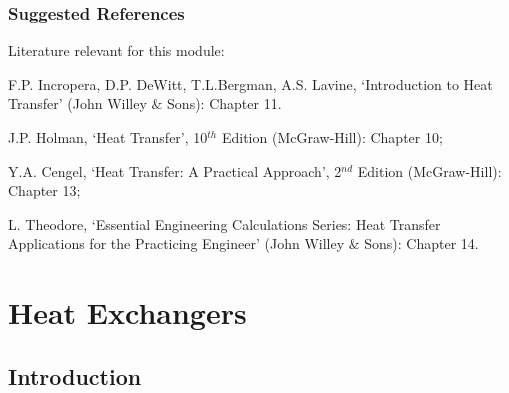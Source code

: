 \documentclass[10pt,compress,unknownkeysallowed]{beamer}
\begin{document}
\begin{frame}
 \frametitle{Suggested References}
  Literature relevant for this module:
  \begin{enumerate}[{[}1{]}]
    \item F.P. Incropera, D.P. DeWitt, T.L.Bergman, A.S. Lavine, `Introduction to Heat Transfer' (John Willey $\&$ Sons): Chapter 11.
    \item J.P. Holman, `Heat Transfer', 10$^{th}$ Edition (McGraw-Hill): Chapter 10;
    \item Y.A. Cengel, `Heat Transfer: A Practical Approach', 2$^{nd}$ Edition (McGraw-Hill): Chapter 13;
    \item L. Theodore, `Essential Engineering Calculations Series: Heat Transfer Applications for the Practicing Engineer' (John Willey $\&$ Sons): Chapter 14.
  \end{enumerate}
\end{frame}


\section{Heat Exchangers} 

\subsection{Introduction}
\end{document}
